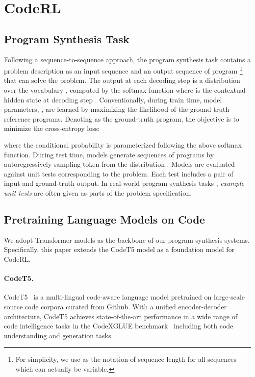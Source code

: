\documentclass{article}
\begin{document}
 
\section{CodeRL}
\label{sec:coderl}
\subsection{Program Synthesis Task}
Following a sequence-to-sequence approach, the program synthesis task contains a problem description as an input sequence  and an output sequence of program  \footnote{For simplicity, we use  as the notation of sequence length for all sequences which can actually be variable.} that can solve the problem.
The output at each decoding step  is a distribution over the vocabulary , computed by the softmax function  where  is the contextual hidden state at decoding step .
Conventionally, during train time, model parameters, , are learned by maximizing the likelihood of the ground-truth reference programs. Denoting  as the ground-truth program, the objective is to minimize the cross-entropy loss: 

where the conditional probability  is parameterized following the above softmax function. 
During test time, models generate sequences of programs by autoregressively sampling token  from the distribution .
Models are evaluated against unit tests corresponding to the problem.
Each test includes a pair of input and ground-truth output. 
In real-world program synthesis tasks \citep{hendrycksapps2021}, \emph{example unit tests} are often given as parts of the problem specification.


\subsection{Pretraining Language Models on Code}
\label{subsec:pretrain_lm}

We adopt Transformer models as the backbone of our program synthesis systems. 
Specifically, this paper extends the CodeT5 model \citep{codet5} as a foundation model for CodeRL.

\paragraph{CodeT5.}
CodeT5~\citep{codet5} is a multi-lingual code-aware language model pretrained on large-scale source code corpora curated from Github. 
With a unified encoder-decoder architecture, CodeT5 achieves state-of-the-art performance in  a wide range of code intelligence tasks in the CodeXGLUE benchmark~\citep{codexglue}  including both code understanding and generation tasks. 
\end{document}
